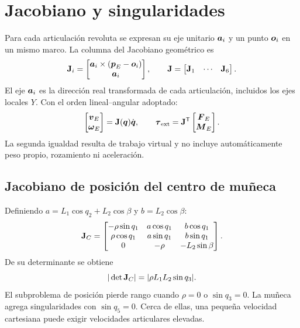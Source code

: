 \section{Jacobiano y singularidades}
Para cada articulación revoluta se expresan su eje unitario $\boldsymbol{a}_i$ y un punto $\boldsymbol{o}_i$ en un mismo marco. La columna del Jacobiano geométrico es
\begin{equation}
\mathbf{J}_i=\begin{bmatrix}
\boldsymbol{a}_i\times(\boldsymbol{p}_E-\boldsymbol{o}_i)\\\boldsymbol{a}_i
\end{bmatrix},
\qquad\mathbf{J}=\begin{bmatrix}\mathbf{J}_1&\cdots&\mathbf{J}_6\end{bmatrix}.
\end{equation}
El eje $\boldsymbol{a}_i$ es la dirección real transformada de cada articulación, incluidos los ejes locales $Y$. Con el orden lineal--angular adoptado:
\begin{equation}
\begin{bmatrix}\boldsymbol{v}_E\\\boldsymbol{\omega}_E\end{bmatrix}=\mathbf{J}(\boldsymbol{q})\dot{\boldsymbol{q}},
\qquad \boldsymbol{\tau}_{\mathrm{ext}}=\mathbf{J}^{\mathsf{T}}
\begin{bmatrix}\boldsymbol{F}_E\\\boldsymbol{M}_E\end{bmatrix}.
\end{equation}
La segunda igualdad resulta de trabajo virtual y no incluye automáticamente peso propio, rozamiento ni aceleración.

\subsection{Jacobiano de posición del centro de muñeca}
Definiendo $a=L_1\cos q_2+L_2\cos\beta$ y $b=L_2\cos\beta$:
\begin{equation}
\mathbf{J}_C=\begin{bmatrix}
-\rho\sin q_1&a\cos q_1&b\cos q_1\\
\rho\cos q_1&a\sin q_1&b\sin q_1\\
0&-\rho&-L_2\sin\beta
\end{bmatrix}.
\end{equation}
De su determinante se obtiene
\begin{equation}
|\det\mathbf{J}_C|=|\rho L_1L_2\sin q_3|.
\end{equation}
El subproblema de posición pierde rango cuando $\rho=0$ o $\sin q_3=0$. La muñeca agrega singularidades con $\sin q_5=0$. Cerca de ellas, una pequeña velocidad cartesiana puede exigir velocidades articulares elevadas.

